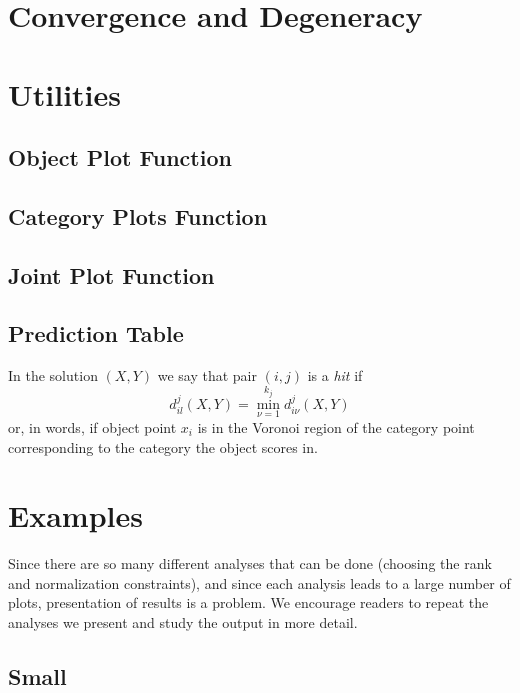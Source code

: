\documentclass[
  12pt,
]{article}
\begin{document}
\section{Convergence and Degeneracy}\label{convergence-and-degeneracy}

\section{Utilities}\label{utilities}

\subsection{Object Plot Function}\label{object-plot-function}

\subsection{Category Plots Function}\label{category-plots-function}

\subsection{Joint Plot Function}\label{joint-plot-function}

\subsection{Prediction Table}\label{prediction-table}

In the solution \((X,Y)\) we say that pair \((i,j)\) is a \emph{hit} if
\[
d_{il}^j(X,Y)=\min_{\nu=1}^{k_j}d_{i\nu}^j(X,Y)
\]
or, in words, if object point \(x_i\) is in the Voronoi region of the category point
corresponding to the category the object scores in.

\section{Examples}\label{examples}

Since there are so many different analyses that can be done (choosing
the rank and normalization constraints), and since each analysis leads
to a large number of plots, presentation of results is a problem. We encourage readers to repeat the analyses we present and study the output
in more detail.

\subsection{Small}\label{small}
\end{document}
